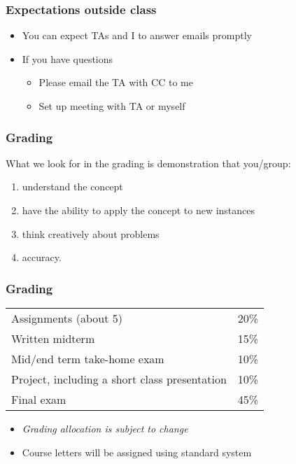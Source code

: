 \begin{frame}\frametitle{Expectations outside class}
	\begin{itemize}
		\item	You can expect TAs and I to answer emails promptly
		\item	If you have questions
			\begin{itemize}
				\item	Please email the TA with CC to me 
				\item	Set up meeting with TA or myself
			\end{itemize}
	\end{itemize}
\end{frame}

\begin{frame}\frametitle{Grading}
	What we look for in the grading is demonstration that you/group:
	\begin{enumerate}
		\item	understand the concept
		\item	have the ability to apply the concept to new instances
		\item	think creatively about problems
		\item	accuracy.
	\end{enumerate}
\end{frame}

\begin{frame}\frametitle{Grading}
	\begin{tabular}{ll}\\
		Assignments (about 5)       	& 20\% \\
	    Written midterm        			& 15\% \\
	    Mid/end term take-home exam		& 10\% \\
	    Project, including a short class presentation& 10\% \\
	    Final exam 						& 45\% \\
	\end{tabular}
	
	\vspace{12pt}
	\vspace{12pt}
	
	\begin{itemize}
		\item	\emph{Grading allocation is subject to change}
		\item	Course letters will be assigned using standard system
	\end{itemize}
\end{frame}

